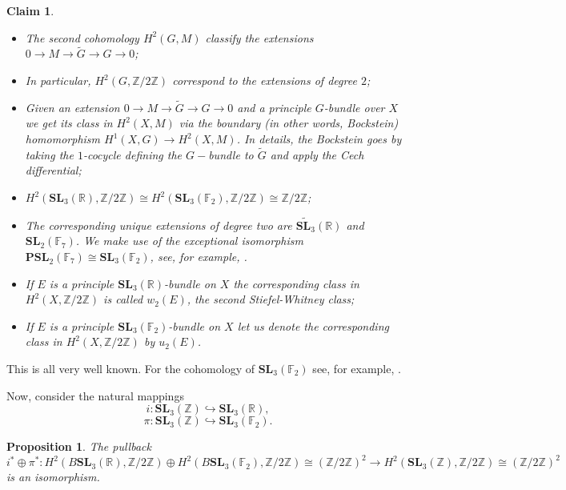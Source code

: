 \documentclass[a4paper]{article}
\newtheorem{Prop}[Thm]{Proposition}
\newtheorem{Cla}[Thm]{Claim}
\newcommand{\embeds}{\hookrightarrow}
\newcommand{\SL}{\mathbf{SL}_3(\mathbb{Z})}        %
\begin{document}
\begin{Cla}
\begin{itemize}
	\item The second cohomology $H^2(G, M)$ classify the extensions $0 \to M \to \tilde G \to G \to 0$;
	\item In particular, $H^2(G, \mathbb{Z}/2\mathbb{Z})$ correspond to the extensions of degree $2$;
\item Given an extension $0 \to M \to \tilde G \to G \to 0$ and a principle $G$-bundle over $X$ we get its class in $H^2(X, M)$ via the boundary (in other words, Bockstein) homomorphism $H^1(X, G) \to H^2(X, M)$.  In details, the Bockstein goes by taking the $1$-cocycle defining the $G-$bundle to $\tilde G$ and apply the Cech differential;
	\item $H^2( \mathbf{SL}_3(\mathbb{R}), \mathbb{Z}/ 2 \mathbb{Z}) \cong
	H^2( \mathbf{SL}_3(\mathbb{F}_2), \mathbb{Z}/ 2 \mathbb{Z}) \cong \mathbb{Z}/2\mathbb{Z}$;
\item The corresponding unique extensions of degree two are $\widetilde{\mathbf{SL}_3}(\mathbb{R})$ and $\mathbf{SL}_2(\mathbb{F}_7)$.
	We make use of the exceptional isomorphism $\mathbf{PSL}_2(\mathbb{F}_7) \cong \mathbf{SL}_3(\mathbb{F}_2)$, see, for example, \cite{merzon_psl_2_7_sl_3_2}.
\item If $E$ is a principle $\mathbf{SL}_3(\mathbb{R})$-bundle on $X$ the corresponding class in $H^2(X, \mathbb{Z}/ 2 \mathbb{Z})$ is called $w_2(E)$, the second Stiefel-Whitney class;
\item If $E$ is a principle $\mathbf{SL}_3(\mathbb{F}_2)$-bundle on $X$ let us denote the corresponding class in $H^2(X, \mathbb{Z}/ 2 \mathbb{Z})$ by $u_2(E)$.
\end{itemize}
\end{Cla}
This is all very well known.
For the cohomology of $\mathbf{SL}_3(\mathbb{F}_2)$ see, for example, \cite{adem2006lecturescohomologyfinitegroups}.

Now, consider the natural mappings
\[
i: \SL \embeds {\mathbf{SL}_3(\mathbb{R})}
, \] 
\[
\pi: \SL \embeds {\mathbf{SL}_3(\mathbb{F}_2)}
.\] 

\begin{Prop}
The pullback 
\[
i^* \oplus \pi^*: 
H^2(B\mathbf{SL}_3(\mathbb{R}), \mathbb{Z}/ 2 \mathbb{Z}) \oplus
H^2(B\mathbf{SL}_3(\mathbb{F}_2), \mathbb{Z}/ 2 \mathbb{Z}) \cong (\mathbb{Z} / 2 \mathbb{Z})^2 \to 
H^2(\SL, \mathbb{Z}/ 2 \mathbb{Z}) \cong (\mathbb{Z}/2\mathbb{Z})^{2}
\] 
is an isomorphism.
\end{Prop}
\end{document}
